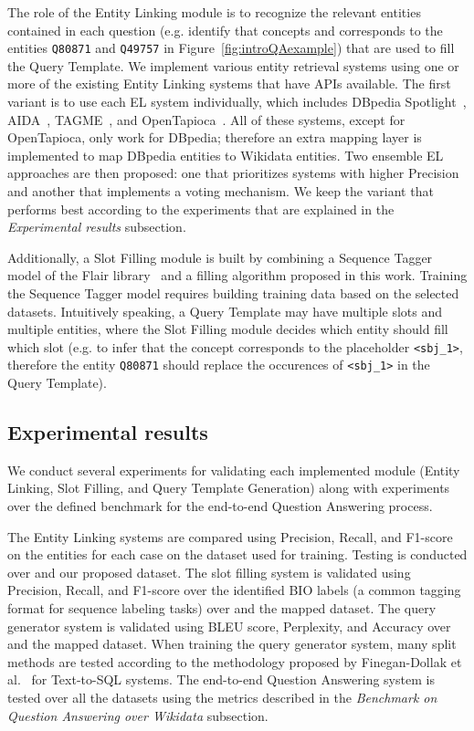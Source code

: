 The role of the Entity Linking module is to recognize the relevant entities contained
in each question (e.g. identify that concepts  and 
corresponds to the entities \texttt{Q80871} and \texttt{Q49757} in Figure~\ref{fig:introQAexample}) 
that are used to fill the Query Template. We implement various entity retrieval systems using 
one or more of the existing Entity 
Linking systems that have APIs available. The first variant is to use each EL system individually, 
which includes DBpedia Spotlight~\cite{EL:dbpedia-spotlight-MendesJGB11}, AIDA~\cite{EL:aida-tool-YosefHBSW11}, 
TAGME~\cite{EL:tagme-FerraginaS10}, and OpenTapioca~\cite{EL:opentapioca-Delpeuch19}. 
All of these systems, except for OpenTapioca, only work for DBpedia; therefore an 
extra mapping layer is implemented to map DBpedia entities to Wikidata entities. Two ensemble 
EL approaches are then proposed: one that prioritizes systems with higher Precision 
and another that implements a voting mechanism. We keep the variant that performs best 
according to the experiments that are explained in the \textit{Experimental results} subsection.

Additionally, a Slot Filling module is built by combining a Sequence Tagger model of the Flair 
library~\cite{seqlab:flair-AkbikBBRSV19} and a filling algorithm proposed in this work. Training 
the Sequence Tagger model requires building training data based on the selected datasets. 
Intuitively speaking, a Query Template may have multiple slots and multiple entities, where the 
Slot Filling module decides which entity should fill which slot (e.g. to infer that the concept 
 corresponds to the placeholder \texttt{<sbj\_1>}, therefore the 
entity \texttt{Q80871} should replace the occurences of \texttt{<sbj\_1>} in the Query Template).

\subsection*{Experimental results}
\label{cap1:intro/contributions/expResults}
We conduct several experiments for validating each implemented module (Entity Linking, 
Slot Filling, and Query Template Generation) along with experiments over the defined 
benchmark for the end-to-end Question Answering process.

The Entity Linking systems are compared using Precision, Recall, and F1-score on the 
entities for each case on the dataset used for training. Testing is conducted over \QALDseven{} and 
our proposed dataset. The slot filling system is validated using Precision, Recall, and F1-score 
over the identified BIO labels (a common tagging format for sequence labeling tasks) over 
\LCQuADtwo{} and the mapped \DBNQA{} dataset. The query generator system is validated 
using BLEU score, Perplexity, and Accuracy over \LCQuADtwo{} and the mapped \DBNQA{} 
dataset. When training the query generator system, many split methods are tested according 
to the methodology proposed by Finegan-Dollak et al.~\cite{semPar:txt-to-sql-RadevKZZFRS18} for Text-to-SQL systems. 
The end-to-end Question Answering system is tested over all the datasets using the metrics 
described in the \textit{Benchmark on Question Answering over Wikidata} subsection.